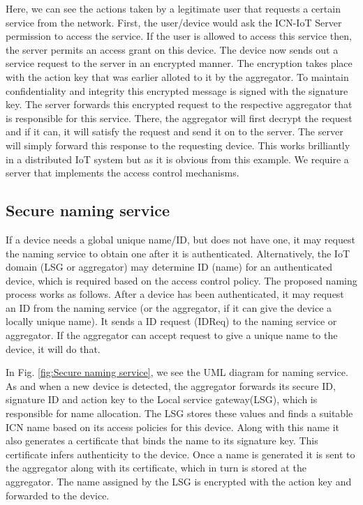 Here, we can see the actions taken by a legitimate user that requests a certain service from the network. First, the user/device  would ask the ICN-IoT Server permission to access the service. If the user is allowed to access this service then, the server permits an access grant on this device. The device now sends out a service request to the server in an encrypted manner. The encryption takes place with the action key that was earlier alloted to it by the aggregator. To maintain confidentiality and integrity this encrypted message is signed with the signature key. The server forwards this encrypted request to the respective aggregator that is responsible for this service. There, the aggregator will first decrypt the request and if it can, it will satisfy the request and send it on to the server. The server will simply forward this response to the requesting device. This works brilliantly in a distributed IoT system but as it is obvious from this example. We require a server that implements the access control mechanisms. 

\par
\subsection{Secure naming service}
\label{subsec: Secure naming service}
If a device needs a global unique name/ID, but does not have one, it may request the naming service to obtain one after it is authenticated. Alternatively, the IoT domain (LSG or aggregator) may determine ID (name) for an authenticated device, which is required based on the access control policy. The proposed naming process works as follows. After a device has been authenticated, it may request an ID from the naming service (or the aggregator, if it can give the device a locally unique name). It sends a ID request (IDReq) to the naming service or aggregator. If the aggregator can accept request to give a unique name to the device, it will do that.\par

\par
In Fig. \ref{fig:Secure naming service}, we see the UML diagram for naming service. As and when a new device is detected, the aggregator forwards its secure ID, signature ID and action key to the Local service gateway(LSG), which is responsible for name allocation. The LSG stores these values and finds a suitable ICN name based on its access policies for this device. Along with this name it also generates a certificate that binds the name to its signature key. This certificate infers authenticity to the device. Once a name is generated it is sent to the aggregator along with its certificate, which in turn is stored at the aggregator. The name assigned by the LSG is encrypted with the action key and forwarded to the device.

